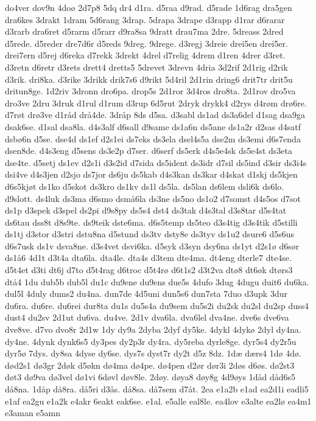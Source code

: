{do4ver
dov9n
4doø
2d7p8
5dq
dr4
d1ra.
d5raa
d9rad.
d5rade
1d6rag
dra5gen
dra6kes
3drakt
1dram
5d6rang
3drap.
5drapa
3drape
d3rapp
d1rar
d6rarar
d3rarb
dra6ret
d5rarm
d5rarr
d9ra8sa
9dratt
drau7ma
2dre.
5dreass
2dred
d5rede.
d5reder
dre7d6r
d5reds
9dreg.
9drege.
d3regj
3dreie
drei5en
drei5er.
drei7ern
d5rej
d6reka
d7rekk
3drekt
4drel
d7relig
4drem
d1ren
4drer
d3ret.
d3retn
d6retr
d3rets
drett4
dretts5
5drevet
3drevn
4dria
3d2rif
2d1rig
d2rik
d3rik.
dri8ka.
d3rike
3drikk
drik7s6
d9rikt
5d4ril
2d1rin
dring6
drit7tr
drit5u
dritun8ge.
1d2riv
3dronn
dro6pa.
drop5s
2d1ror
3d4ros
dro8ta.
2d1rov
dro5va
dro3ve
2dru
3druk
d1rul
d1rum
d3rup
6d5rut
2dryk
drykk4
d2rys
d4røm
drø6re.
d7røt
drø3ve
d1råd
drå4de.
3dråp
8ds
d5sa.
d3sabl
ds1ad
ds3a6del
d1sag
dsa9ga
dsak6se.
d1sal
dsa8la.
d4s3alf
d6sall
d9same
ds1a6n
ds5ane
ds1a2r
d2sas
d4satf
dsbø6n
d5se.
dse4d
ds1ef
d2s1ei
ds7eks
ds3ela
dsel4s5a
dse2m
ds3emi
d6s7enda
dsen8de.
d4s3eng
d5sens
ds3e2p
d7ser.
d6serf
ds5erk
d4s5e4sk
ds5e4st
ds3eta
dse4te.
d5setj
ds1ev
d2s1i
d3s2id
d7sida
ds5ident
ds3idr
d7sil
ds5ind
d3sir
ds3i4s
dsi4ve
d4s3jen
d2sjo
ds7jor
ds6ju
ds5kab
d4s3kan
ds3kar
d4skat
d1skj
ds5kjen
d6s5kjøt
ds1ko
d5skot
ds3kro
ds1kv
ds1l
ds5la.
ds5lan
ds6lem
dsli6k
ds6lo.
d9slott.
ds4luk
ds3ma
d6smo
dsmå6la
ds3ne
ds5no
ds1o2
d7somst
d4s5os
d7sot
ds1p
d3spek
d3spel
ds2pi
d9s8py
ds5s4
dst4
ds3tak
d4s3tal
d3s8tar
d5s4tat
ds6tau
dss8t
d8s9te.
ds9teik
dste6ma.
d6s5temp
ds5teo
d3s4tig
d3s4tik
d5stilli
ds1tj
d3stor
d3stri
dstu8na
d5stund
ds3tv
dsty8e
ds3tyv
ds1u2
dsure6
d5s6us
d6s7usk
ds1v
dsva8ne.
d3s4vet
dsvi6ka.
d5syk
d3syn
dsy6na
ds1yt
d2s1ø
d6sør
ds1å6
4d1t
d3t4a
dta6la.
dta4le.
dta4s
d3tem
dte4ma.
dt4eng
dterle7
dte4se.
d5t4et
d3ti
dt6j
d7to
d5t4rag
d6troc
d5t4rø
d6t1s2
d3t2va
dtø8
dt6øk
dtørs3
dtå4
1du
dub5b
dub5l
du1c
du9ene
du9ens
due5s
4dufo
3dug
4dugu
duit6
du6ka.
dul5l
4duly
dums2
du4na.
dun7de
4d5uni
dun5s6
dun7sta
7duo
d3upk
3dur
du6ra.
du6re.
du6rei
dur8ta
du1s
du5s4a
du9sem
du5s2i
du2sk
du2sl
du2sp
duss4
dust4
du2sv
2d1ut
du6va.
du4ve.
2d1v
dva6la.
dva6lel
dva4ne.
dve6s
dve6va
dve8ve.
d7vo
dvo8r
2d1w
1dy
dy9a
2dyba
2dyf
dy5ke.
4dykl
4dykø
2dyl
dy4na.
dy4ne.
4dynk
dynk6s5
dy3pes
dy2p3r
dy4ra.
dy5reba
dyrle8ge.
dyr5s4
dy2r5u
dyr5ø
7dys.
dy8sa
4dyse
dy6se.
dys7s
dyst7r
dy2t
d5z
8dz.
1dæ
dærs4
1dø
4dø.
død2s1
dø3gr
2døk
d5økn
dø4ma
dø4pe.
dø4pen
d2ør
dør3i
2døs
d6øs.
dø2st3
døt3
dø9va
dø3vel
dø1vi
6døvl
døv8le.
2døy.
døya8
døy8g
4d9øys
1dåd
dåd6s5
då8na.
1dåp
då8ra.
då5ri
d3ås.
då8sa.
då7sem
d7åt.
2ea
e1a2b
e1ad
ea2d1i
eadli5
e1af
ea2gu
e1a2k
e4akr
6eakt
eak6se.
e1al.
e5alle
eal8le.
ea4lov
e3alte
ea2lø
ea4m1
e3aman
e5amn
}
